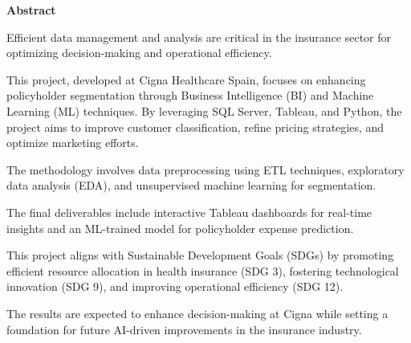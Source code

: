 \begin{center}
    {\large \textbf{Abstract}} \vspace{2cm}
\end{center}

Efficient data management and analysis are critical in the insurance sector for optimizing decision-making and operational efficiency. 

This project, developed at Cigna Healthcare Spain, focuses on enhancing policyholder segmentation through Business Intelligence (BI) and Machine Learning (ML) techniques. By leveraging SQL Server, Tableau, and Python, the project aims to improve customer classification, refine pricing strategies, and optimize marketing efforts.

The methodology involves data preprocessing using ETL techniques, exploratory data analysis (EDA), and unsupervised machine learning for segmentation. 

The final deliverables include interactive Tableau dashboards for real-time insights and an ML-trained model for policyholder expense prediction.

This project aligns with Sustainable Development Goals (SDGs) by promoting efficient resource allocation in health insurance (SDG 3), fostering technological innovation (SDG 9), and improving operational efficiency (SDG 12). 

The results are expected to enhance decision-making at Cigna while setting a foundation for future AI-driven improvements in the insurance industry.